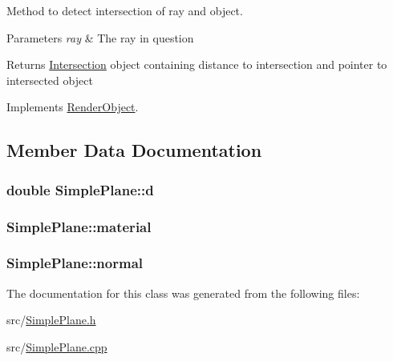Method to detect intersection of ray and object. 


\begin{DoxyParams}{Parameters}
{\em ray} & The ray in question \\
\hline
\end{DoxyParams}
\begin{DoxyReturn}{Returns}
\hyperlink{classIntersection}{Intersection} object containing distance to intersection and pointer to intersected object 
\end{DoxyReturn}


Implements \hyperlink{classRenderObject_aa844ad2c5ef0c2b79faef2ed0af553bb}{Render\+Object}.



\subsection{Member Data Documentation}
\subsubsection[{\texorpdfstring{d}{d}}]{\setlength{\rightskip}{0pt plus 5cm}double Simple\+Plane\+::d\hspace{0.3cm}{\ttfamily [private]}}\hypertarget{classSimplePlane_a84850a97b34a8616c7ffdd51c30a5dc9}{}\label{classSimplePlane_a84850a97b34a8616c7ffdd51c30a5dc9}
\subsubsection[{\texorpdfstring{material}{material}}]{ Simple\+Plane\+::material\hspace{0.3cm}{\ttfamily [private]}}\hypertarget{classSimplePlane_a04307eae806daa2cd2f1c471224b44cf}{}\label{classSimplePlane_a04307eae806daa2cd2f1c471224b44cf}
\subsubsection[{\texorpdfstring{normal}{normal}}]{ Simple\+Plane\+::normal\hspace{0.3cm}{\ttfamily [private]}}\hypertarget{classSimplePlane_a222f5d12aed966bc2764abc90b622037}{}\label{classSimplePlane_a222f5d12aed966bc2764abc90b622037}


The documentation for this class was generated from the following files\+:\begin{DoxyCompactItemize}
\item 
src/\hyperlink{SimplePlane_8h}{Simple\+Plane.\+h}\item 
src/\hyperlink{SimplePlane_8cpp}{Simple\+Plane.\+cpp}\end{DoxyCompactItemize}
